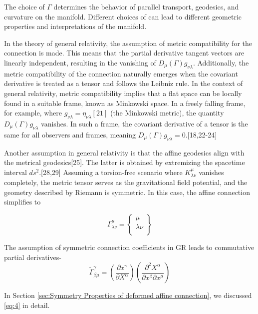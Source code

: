 \documentclass{article}
\begin{document}
The choice of $\Gamma$
 determines the behavior of parallel transport, geodesics, and curvature on the manifold. Different choices of  can lead to different geometric properties and interpretations of the manifold.


In the theory of general relativity, the assumption of metric compatibility for the connection is made. This means that the partial derivative tangent vectors are linearly independent, resulting in the vanishing of $D_{\mu}(\Gamma)g_{\nu\lambda}
$. Additionally, the metric compatibility of the connection naturally emerges when the covariant derivative is treated as a tensor and follows the Leibniz rule.
In the context of general relativity, metric compatibility implies that a flat space can be locally found in a suitable frame, known as Minkowski space. In a freely falling frame, for example, where $g_{\nu\lambda} = \eta_{\nu\lambda} [21]
$ (the Minkowski metric), the quantity $D_{\mu}(\Gamma)g_{\nu\lambda}$ vanishes. In such a frame, the covariant derivative of a tensor is the same for all observers and frames, meaning $D_{\mu}(\Gamma)g_{\nu\lambda}=0$.[18,22-24]

Another assumption in general relativity is that the affine geodesics align with the metrical geodesics[25]. The latter is obtained by extremizing the spacetime interval $ds^2$.[28,29] Assuming a torsion-free scenario where ${K^\mu_{\lambda\nu}}
$ vanishes completely, the metric tensor serves as the gravitational field potential, and the geometry described by Riemann is symmetric. In this case, the affine connection simplifies to

\begin{equation}
    \Gamma^{\mu}_{\lambda\nu} = \begin{Bmatrix}
\mu \\
\lambda \nu \\
\end{Bmatrix}
\label{eq:3}
\end{equation}

The assumption of symmetric connection coefficients in GR leads to commutative partial derivatives-
\begin{equation}
  \widetilde{\Gamma}^
{\gamma}_{\beta\mu} = \left(\frac{\partial x^{\gamma}}{\partial X^{\alpha}}\right) \left(\frac{\partial^2 X^{\alpha}}{\partial x^{\beta}\partial x^{\mu}}\right)
\label{eq:4}
\end{equation}


In Section \ref{sec:Symmetry Properties of deformed affine connection}, we discussed \eqref{eq:4} in detail.
\end{document}
